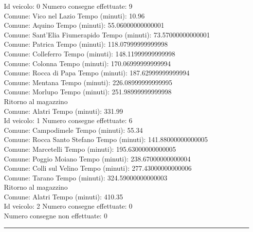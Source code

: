 \documentclass[a4paper,12pt]{report}
\begin{document}
Id veicolo: 0	Numero consegne effettuate: 9\\
Comune: Vico nel Lazio	 Tempo (minuti): 10.96\\
Comune: Aquino	 Tempo (minuti): 55.06000000000001\\
Comune: Sant'Elia Fiumerapido	 Tempo (minuti): 73.57000000000001\\
Comune: Patrica	 Tempo (minuti): 118.07999999999998\\
Comune: Colleferro	 Tempo (minuti): 148.11999999999998\\
Comune: Colonna	 Tempo (minuti): 170.06999999999994\\
Comune: Rocca di Papa	 Tempo (minuti): 187.62999999999994\\
Comune: Mentana	 Tempo (minuti): 226.08999999999995\\
Comune: Morlupo	 Tempo (minuti): 251.98999999999998\\
Ritorno al magazzino\\
Comune: Alatri	 Tempo (minuti): 331.99\\

Id veicolo: 1	Numero consegne effettuate: 6\\
Comune: Campodimele	 Tempo (minuti): 55.34\\
Comune: Rocca Santo Stefano	 Tempo (minuti): 141.88000000000005\\
Comune: Marcetelli	 Tempo (minuti): 195.63000000000005\\
Comune: Poggio Moiano	 Tempo (minuti): 238.67000000000004\\
Comune: Colli sul Velino	 Tempo (minuti): 277.43000000000006\\
Comune: Tarano	 Tempo (minuti): 324.59000000000003\\
Ritorno al magazzino\\
Comune: Alatri	 Tempo (minuti): 410.35\\

Id veicolo: 2	Numero consegne effettuate: 0\\

Numero consegne non effettuate: 0\\
\hrule
\end{document}
